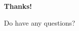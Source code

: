{
\begin{frame}[plain]
  \vfill
  \centering
  {\Huge\bfseries\color{primaryNavy} Thanks!}

  \vskip1cm
  {\Large Do have any questions?}
  \vfill
\end{frame}
}
